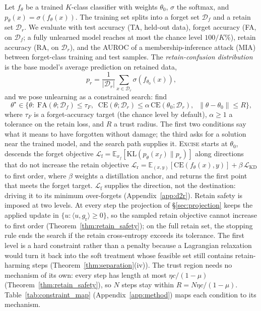\documentclass{article}
\newcommand{\ours}{\textsc{Excise}}
\newcommand{\KL}{\mathrm{KL}}
\newcommand{\CE}{\mathrm{CE}}
\newcommand{\Df}{\mathcal{D}_f}
\newcommand{\Dr}{\mathcal{D}_r}
\newcommand{\gr}{g_{\mathrm{r}}}
\newcommand{\lossf}{\mathcal{L}_{\mathrm{f}}}
\newcommand{\lossr}{\mathcal{L}_{\mathrm{r}}}
\newcommand{\losskd}{\mathcal{L}_{\mathrm{KD}}}
\newcommand{\rev}[1]{{\color{revisedB}#1}}
\theoremstyle{remark}
\theoremstyle{plain}
\begin{document}
Let $f_\theta$ be a trained $K$-class classifier with weights $\theta_0$,
$\sigma$ the softmax, and $p_\theta(x) = \sigma(f_\theta(x))$. The training set
splits into a forget set $\Df$ and a retain set $\Dr$. We evaluate with test
accuracy (TA, held-out data), forget accuracy (FA, on $\Df$; a fully unlearned
model reaches at most the chance level $100/K\%$), retain accuracy (RA, on
$\Dr$), and the AUROC of a membership-inference attack (MIA) between forget-class
training and test samples. The \emph{retain-confusion distribution} is the base
model's average prediction on retained data,
\begin{equation}\label{eq:retain_confuse}
p_r = \frac{1}{|\Dr|}\sum_{x \in \Dr} \sigma(f_{\theta_0}(x)),
\end{equation}
and we pose unlearning as \rev{a constrained search: find
\begin{equation}\label{eq:problem}
\theta^\star \in \big\{\theta :\;
\mathrm{FA}(\theta;\Df) \le \tau_F,\;\;
\CE(\theta;\Dr) \le \alpha\,\CE(\theta_0;\Dr),\;\;
\|\theta - \theta_0\| \le R \big\},
\end{equation}
where $\tau_F$ is a forget-accuracy target (the chance level by default),
$\alpha \ge 1$ a tolerance on the retain loss, and $R$ a trust radius. The first
two conditions say what it means to have forgotten without damage; the third
asks for a solution near the trained model, and the search path supplies it.
\ours{} starts at $\theta_0$, descends the forget objective
$\lossf = \mathbb{E}_{x_f}[\KL(p_\theta(x_f)\|p_r)]$ along directions that do
not increase the retain objective
$\lossr = \mathbb{E}_{(x,y)}[\CE(f_\theta(x),y)] + \beta\,\losskd$ to first
order, where $\beta$ weights a distillation anchor, and returns the first point
that meets the forget target. $\lossf$ supplies the direction, not the
destination: driving it to its minimum over-forgets (Appendix~\ref{app:d2r}).
Retain safety is imposed at two levels. At every step the projection of
\S\ref{sec:projection} keeps the applied update in
$\{u : \langle u,\gr\rangle \ge 0\}$, so the sampled retain objective cannot
increase to first order (Theorem~\ref{thm:retain_safety}); on the full retain
set, the stopping rule ends the search if the retain cross-entropy exceeds its
tolerance. The first level is a hard constraint rather than a penalty because a
Lagrangian relaxation would turn it back into the soft treatment whose feasible
set still contains retain-harming steps (Theorem~\ref{thm:separation}(iv)). The
trust region needs no mechanism of its own: every step has length at most
$\eta c/(1-\mu)$ (Theorem~\ref{thm:retain_safety}), so $N$ steps stay within
$R = N\eta c/(1-\mu)$. Table~\ref{tab:constraint_map}
(Appendix~\ref{app:method}) maps each condition to its mechanism.}
\end{document}
